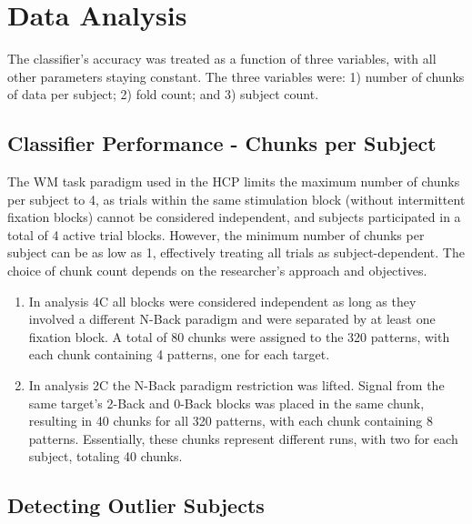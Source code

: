 
\section{Data Analysis}

The classifier's accuracy was treated as a function of three variables, with all other parameters staying constant. The three variables were: 1) number of chunks of data per subject; 2) fold count; and 3) subject count.

\subsection{Classifier Performance - Chunks per Subject}
\label{subs:ch_per_subj}

The \gls{WM} task paradigm used in the \gls{HCP} limits the maximum number of chunks per subject to 4, as trials within the same stimulation block (without intermittent fixation blocks) cannot be considered independent, and subjects participated in a total of 4 active trial blocks. However, the minimum number of chunks per subject can be as low as 1, effectively treating all trials as subject-dependent. The choice of chunk count depends on the researcher's approach and objectives.

\begin{enumerate}[label=\Roman*.]

\item In analysis \gls{4C} all blocks were considered independent as long as they involved a different N-Back paradigm and were separated by at least one fixation block. A total of 80 chunks were assigned to the 320 patterns, with each chunk containing 4 patterns, one for each target.

\item In analysis \gls{2C} the N-Back paradigm restriction was lifted. Signal from the same target's 2-Back and 0-Back blocks was placed in the same chunk, resulting in 40 chunks for all 320 patterns, with each chunk containing 8 patterns. Essentially, these chunks represent different runs, with two for each subject, totaling 40 chunks.

\end{enumerate}

\subsection{Detecting Outlier Subjects}
\label{subs:outliers}

